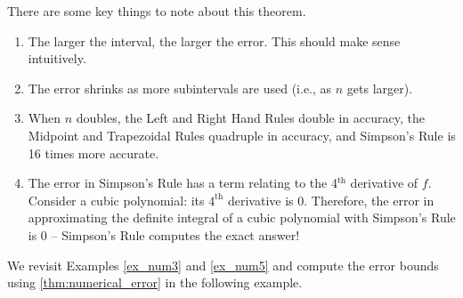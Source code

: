 There are some key things to note about this theorem.
\begin{enumerate}
	\item	The larger the interval, the larger the error. This should make sense intuitively.
	\item	The error shrinks as more subintervals are used (i.e., as $n$ gets larger).
	\item	When $n$ doubles, the Left and Right Hand Rules double in accuracy, the Midpoint and Trapezoidal Rules quadruple in accuracy, and Simpson's Rule is 16 times more accurate.
	\item	The error in Simpson's Rule has a term relating to the 4$^{\text{th}}$ derivative of $f$. Consider a cubic polynomial: its $4^{\text{th}}$ derivative is 0. Therefore, the error in approximating the definite integral of a cubic polynomial with Simpson's Rule is 0 -- Simpson's Rule computes the exact answer!
\end{enumerate}

We revisit Examples \ref{ex_num3} and \ref{ex_num5} and compute the error bounds using \autoref{thm:numerical_error} in the following example.

